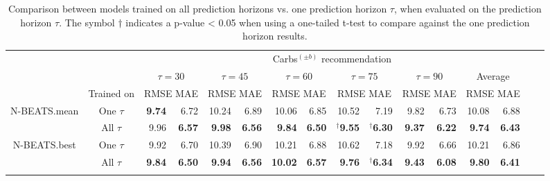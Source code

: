 \documentclass[journal,article,submit,moreauthors,pdftex]{Definitions/mdpi}
\begin{document}
\begin{table}[t]
\setlength{\tabcolsep}{1.75pt}
\caption{Comparison between models trained on all prediction horizons vs. one prediction horizon $\tau$, when evaluated on the prediction horizon $\tau$. The symbol $\dagger$ indicates a p-value < 0.05 when using a one-tailed t-test to compare against the one prediction horizon results.}
\begin{center}
\label{tab:transfer_time}
\begin{tabular}{|c|c|rr|rr|rr|rr|rr|rr|rr}
    \cline{3-14}
    \multicolumn{2}{c|}{} & \multicolumn{12}{c|}{Carbs$^{(\pm b)}$ recommendation}\\
    \cline{3-14}
    \multicolumn{2}{c|}{} & \multicolumn{2}{c|}{$\tau=30$} & \multicolumn{2}{c|}{$\tau=45$} & \multicolumn{2}{c|}{$\tau=60$} & \multicolumn{2}{c|}{$\tau=75$} & \multicolumn{2}{c|}{$\tau=90$} & \multicolumn{2}{c|}{Average}\\
    \cline{2-14}
     \multicolumn{1}{c|}{}& Trained on & \multicolumn{2}{c|}{\scriptsize RMSE MAE} & \multicolumn{2}{c|}{\scriptsize RMSE MAE} & \multicolumn{2}{c|}{\scriptsize RMSE MAE} & \multicolumn{2}{c|}{\scriptsize RMSE MAE} & \multicolumn{2}{c|}{\scriptsize RMSE MAE} & \multicolumn{2}{c|}{\scriptsize RMSE MAE} \\
    \hline
    \multirow{2}{*}{N-BEATS.mean} & One $\tau$ & {\bf 9.74} & 6.72 & 10.24 & 6.89 & 10.06 & 6.85 & 10.52 & 7.19 & 9.82 & 6.73 & 10.08 & 6.88\\
    & All $\tau$ & 9.96 & {\bf 6.57} & {\bf 9.98} & {\bf 6.56} & {\bf 9.84} & {\bf 6.50} & $^\dagger${\bf 9.55} & $^\dagger${\bf 6.30}& {\bf 9.37} & {\bf 6.22} & {\bf 9.74} & {\bf 6.43}\\
    \hline
    \multirow{2}{*}{N-BEATS.best} & One $\tau$ & 9.92 & 6.70 & 10.39 & 6.90 & 10.21 & 6.88 & 10.62 & 7.18 & 9.92 & 6.66 & 10.21 & 6.86\\
    & All $\tau$ & {\bf 9.84} & {\bf 6.50} & {\bf 9.94} & {\bf 6.56} & {\bf 10.02} & {\bf 6.57} & {\bf 9.76} & $^\dagger${\bf 6.34} & {\bf 9.43} & {\bf 6.08} & {\bf 9.80} & {\bf 6.41}\\
    \hline
    
    \multicolumn{14}{c}{}\\[-1.5ex]


\end{tabular}
\end{center}
\end{table}
\end{document}

